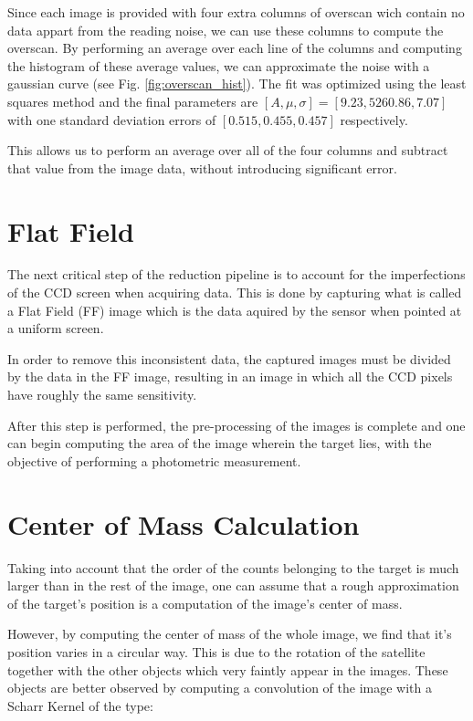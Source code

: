 \documentclass{aa}
\begin{document}
Since each image is provided with four extra columns of overscan wich contain no data appart from the reading noise, we can use these columns to compute the overscan. By performing an average over each line of the columns and computing the histogram of these average values, we can approximate the noise with a gaussian curve (see Fig. \ref{fig:overscan_hist}). The fit was optimized using the least squares method and the final parameters are $[A, \mu , \sigma] = [9.23, 5260.86, 7.07]$ with one standard deviation errors of $[0.515, 0.455, 0.457]$ respectively.

This allows us to perform an average over all of the four columns and subtract that value from the image data, without introducing significant error.

\section{Flat Field}

The next critical step of the reduction pipeline is to account for the imperfections of the CCD screen when acquiring data. This is done by capturing what is called a Flat Field (FF) image which is the data aquired by the sensor when pointed at a uniform screen.

In order to remove this inconsistent data, the captured images must be divided by the data in the FF image, resulting in an image in which all the CCD pixels have roughly the same sensitivity.

After this step is performed, the pre-processing of the images is complete and one can begin computing the area of the image wherein the target lies, with the objective of performing a photometric measurement.

\section{Center of Mass Calculation}

Taking into account that the order of the counts belonging to the target is much larger than in the rest of the image, one can assume that a rough approximation of the target's position is a computation of the image's center of mass.

However, by computing the center of mass of the whole image, we find that it's position varies in a circular way. This is due to the rotation of the satellite together with the other objects which very faintly appear in the images. These objects are better observed by computing a convolution of the image with a Scharr Kernel of the type:
\end{document}
